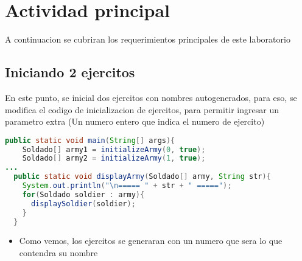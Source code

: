 \section{Actividad principal}
A continuacion se cubriran los requerimientos principales de este laboratorio

\subsection{Iniciando 2 ejercitos}
    En este punto, se inicial dos ejercitos con nombres autogenerados, para eso, se modifica el codigo de inicializacion de ejercitos, para permitir ingresar un parametro extra (Un numero entero que indica el numero de ejercito)
\begin{lstlisting}[language=java, caption={Codigo fuente, Videojuego.java}]
public static void main(String[] args){
    Soldado[] army1 = initializeArmy(0, true); 
    Soldado[] army2 = initializeArmy(1, true); 
... 
  public static void displayArmy(Soldado[] army, String str){
    System.out.println("\n===== " + str + " =====");
    for(Soldado soldier : army){
      displaySoldier(soldier);
    }
  }
\end{lstlisting}
\begin{itemize}
  \item Como vemos, los ejercitos se generaran con un numero que sera lo que contendra su nombre
\end{itemize}
